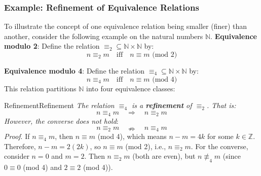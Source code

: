 \documentclass[a4paper]{article}
\theoremstyle{definition}
\begin{document}
\subsubsection{Example: Refinement of Equivalence Relations}
To illustrate the concept of one equivalence relation being smaller (finer) than another, consider 
the following example on the natural numbers \( \mathbb{N} \).
\vspace{1em}
\noindent 
\newline
\textbf{Equivalence modulo 2}: Define the relation \( \equiv_2 \subseteq \mathbb{N} \times \mathbb{N} \) by:
\[
  n \equiv_2 m \quad \text{iff} \quad n \equiv m \text{ (mod 2)}
\] 
\begin{center}
\end{center}
\textbf{Equivalence modulo 4}: Define the relation \( \equiv_4 \subseteq \mathbb{N} \times \mathbb{N} \) by:
\[
  n \equiv_4 m \quad \text{iff} \quad n \equiv m \text{ (mod 4)}
\]
This relation partitions \( \mathbb{N} \) into four equivalence classes:
\begin{center}
\end{center}
\begin{definition}{Refinement}{Refinement} 
\textit{The relation \( \equiv_4 \) is a \textbf{refinement} of \( \equiv_2 \). That is:}
\[
  n \equiv_4 m \quad \Rightarrow \quad n \equiv_2 m
\]
\textit{However, the converse does not hold}:
\[
  n \equiv_2 m \quad \nRightarrow \quad n \equiv_4 m
\]
\textit{Proof}. If \( n \equiv_4 m \), then \( n \equiv m \) (mod 4), which means \( n - m = 4k \) for some \( k \in \mathbb{Z} \).
Therefore, \( n - m = 2(2k) \), so \( n \equiv m \) (mod 2), i.e., \( n \equiv_2 m \).
\vspace{1em}
\noindent
\newline
For the converse, consider \( n = 0 \) and \( m = 2 \). Then \( n \equiv_2 m \) (both are even), but \( n \mathrel{\not\equiv_4} m \) (since 
\( 0 \equiv 0 \) (mod 4) and \( 2 \equiv 2 \) (mod 4)).
\end{definition}
\end{document}

